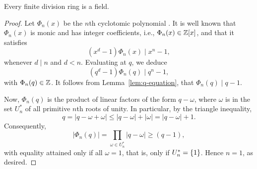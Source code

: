 \begin{thm}\label{thm:wedderburn}{\upshape[Wedderburn, 1905]}
    Every finite division ring is a field.
\end{thm}

\begin{proof}
    Let $\Phi_n(x)$ be the $n$th cyclotomic polynomial \citep{LC-Galois}. It is well known that $\Phi_n(x)$ is monic and has integer coefficients, i.e., $\Phi_n(x)\in\mathbb{Z}[x]$, and that it satisfies
    \[
        (x^d-1)\Phi_n(x)\mid x^n-1,
    \]
    whenever $d\mid n$ and $d<n$. Evaluating at $q$, we deduce
    \[
        (q^d-1)\Phi_n(q)\mid q^n-1,
    \]
    with $\Phi_n(q)\in\mathbb{Z}$. It follows from Lemma~\ref{lem:q-equation}, that $\Phi_n(q)\mid q-1$.

    Now, $\Phi_n(q)$ is the product of linear factors of the form $q-\omega$, where $\omega$ is in the set $U^*_n$ of all primitive $n$th roots of unity. In particular, by the triangle inequality,
    \[
        q = |q-\omega+\omega|\le |q-\omega|+|\omega| = |q-\omega|+1.
    \]
    Consequently,
    \[
        |\Phi_n(q)| = \prod_{\omega\in U^*_n}|q-\omega|\ge (q-1),
    \]
    with equality attained only if all $\omega=1$, that is, only if $U_n^*=\{1\}$. Hence $n=1$, as desired.
    
\end{proof}
